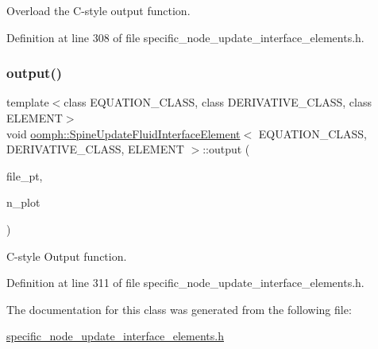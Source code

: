 Overload the C-\/style output function. 



Definition at line 308 of file specific\+\_\+node\+\_\+update\+\_\+interface\+\_\+elements.\+h.

\mbox{\label{classoomph_1_1SpineUpdateFluidInterfaceElement_af876d90d19b6faa253260193ded3f175}} 
\subsubsection{\texorpdfstring{output()}{output()}\hspace{0.1cm}{\footnotesize\ttfamily [4/4]}}
{\footnotesize\ttfamily template$<$class E\+Q\+U\+A\+T\+I\+O\+N\+\_\+\+C\+L\+A\+SS, class D\+E\+R\+I\+V\+A\+T\+I\+V\+E\+\_\+\+C\+L\+A\+SS, class E\+L\+E\+M\+E\+NT$>$ \\
void \hyperlink{classoomph_1_1SpineUpdateFluidInterfaceElement}{oomph\+::\+Spine\+Update\+Fluid\+Interface\+Element}$<$ E\+Q\+U\+A\+T\+I\+O\+N\+\_\+\+C\+L\+A\+SS, D\+E\+R\+I\+V\+A\+T\+I\+V\+E\+\_\+\+C\+L\+A\+SS, E\+L\+E\+M\+E\+NT $>$\+::output (\begin{DoxyParamCaption}\item[{F\+I\+LE $\ast$}]{file\+\_\+pt,  }\item[{const unsigned \&}]{n\+\_\+plot }\end{DoxyParamCaption})\hspace{0.3cm}{\ttfamily [inline]}}



C-\/style Output function. 



Definition at line 311 of file specific\+\_\+node\+\_\+update\+\_\+interface\+\_\+elements.\+h.



The documentation for this class was generated from the following file\+:\begin{DoxyCompactItemize}
\item 
\hyperlink{specific__node__update__interface__elements_8h}{specific\+\_\+node\+\_\+update\+\_\+interface\+\_\+elements.\+h}\end{DoxyCompactItemize}
